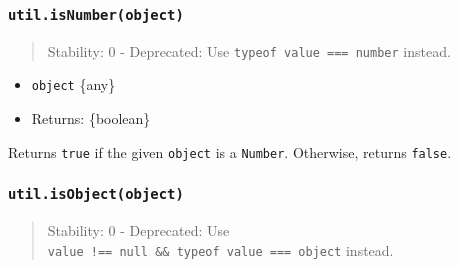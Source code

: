 \subsubsection{\texorpdfstring{\texttt{util.isNumber(object)}}{util.isNumber(object)}}\label{util.isnumberobject}

\begin{quote}
Stability: 0 - Deprecated: Use
\texttt{typeof\ value\ ===\ \textquotesingle{}number\textquotesingle{}}
instead.
\end{quote}

\begin{itemize}
\tightlist
\item
  \texttt{object} \{any\}
\item
  Returns: \{boolean\}
\end{itemize}

Returns \texttt{true} if the given \texttt{object} is a \texttt{Number}.
Otherwise, returns \texttt{false}.

\begin{Shaded}
\begin{Highlighting}[]
\OperatorTok{=} \NormalTok{(}\NormalTok{)}\OperatorTok{;}

\NormalTok{(}\NormalTok{)}\OperatorTok{;}
\NormalTok{(}\NormalTok{)}\OperatorTok{;}
\NormalTok{(}\NormalTok{)}\OperatorTok{;}
\NormalTok{(}\NormalTok{)}\OperatorTok{;}
\end{Highlighting}
\end{Shaded}

\subsubsection{\texorpdfstring{\texttt{util.isObject(object)}}{util.isObject(object)}}\label{util.isobjectobject}

\begin{quote}
Stability: 0 - Deprecated: Use
\texttt{value\ !==\ null\ \&\&\ typeof\ value\ ===\ \textquotesingle{}object\textquotesingle{}}
instead.
\end{quote}

